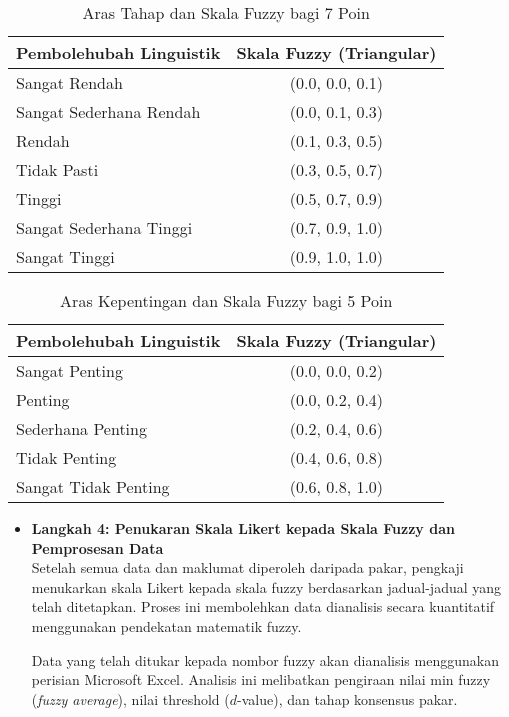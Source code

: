 \begin{itemize}
\begin{table}[h]
\centering
\caption{Aras Tahap dan Skala Fuzzy bagi 7 Poin}
\label{jadual:fuzzyTahap7}
\begin{tabular}{|p{6cm}|c|}
\hline
\textbf{Pembolehubah Linguistik} & \textbf{Skala Fuzzy (Triangular)} \\
\hline
Sangat Rendah & (0.0, 0.0, 0.1) \\
Sangat Sederhana Rendah & (0.0, 0.1, 0.3) \\
Rendah & (0.1, 0.3, 0.5) \\
Tidak Pasti & (0.3, 0.5, 0.7) \\
Tinggi & (0.5, 0.7, 0.9) \\
Sangat Sederhana Tinggi & (0.7, 0.9, 1.0) \\
Sangat Tinggi & (0.9, 1.0, 1.0) \\
\hline
\end{tabular}
\end{table}
\begin{table}[H]
\centering
\caption{Aras Kepentingan dan Skala Fuzzy bagi 5 Poin}
\label{jadual:fuzzyKepentingan5}
\begin{tabular}{|p{6cm}|c|}
\hline
\textbf{Pembolehubah Linguistik} & \textbf{Skala Fuzzy (Triangular)} \\
\hline
Sangat Penting & (0.0, 0.0, 0.2) \\
Penting & (0.0, 0.2, 0.4) \\
Sederhana Penting & (0.2, 0.4, 0.6) \\
Tidak Penting & (0.4, 0.6, 0.8) \\
Sangat Tidak Penting & (0.6, 0.8, 1.0) \\
\hline
\end{tabular}
\end{table}
\begin{itemize}
  \item \textbf{Langkah 4: Penukaran Skala Likert kepada Skala Fuzzy dan Pemprosesan Data} \\
  Setelah semua data dan maklumat diperoleh daripada pakar, pengkaji menukarkan skala Likert kepada skala fuzzy berdasarkan jadual-jadual yang telah ditetapkan. Proses ini membolehkan data dianalisis secara kuantitatif menggunakan pendekatan matematik fuzzy.

  Data yang telah ditukar kepada nombor fuzzy akan dianalisis menggunakan perisian Microsoft Excel. Analisis ini melibatkan pengiraan nilai min fuzzy (\textit{fuzzy average}), nilai threshold (\(d\)-value), dan tahap konsensus pakar.
\end{itemize}


\end{itemize}
